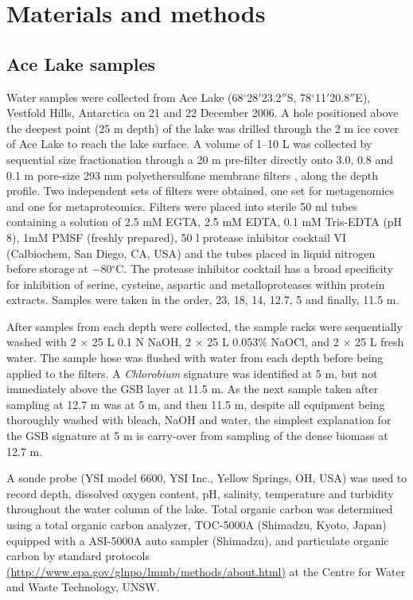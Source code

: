 
\section{Materials and methods}
\label{sec:ace_mm}
\subsection{Ace Lake samples}
Water samples were collected from Ace Lake (68$^{\circ}$28$'$23.2$''$S, 78$^{\circ}$11$'$20.8$''$E), Vestfold Hills, Antarctica on 21 and 22 December 2006. 
A hole positioned above the deepest point (25 m depth) of the lake was drilled through the 2 m ice cover of Ace Lake to reach the lake surface.
A volume of 1--10 L was collected by sequential size fractionation through a 20 \textmu{}m pre-filter directly onto 3.0, 0.8 and 0.1 \textmu{}m pore-size 293 mm polyethersulfone membrane filters \cite{Rusch2007}, along the depth profile.
Two independent sets of filters were obtained, one set for metagenomics and one for metaproteomics.
Filters were placed into sterile 50 ml tubes containing a solution of 2.5 mM EGTA, 2.5 mM EDTA, 0.1 mM Tris-EDTA (pH 8), 1mM PMSF (freshly prepared), 50 \textmu{}l protease inhibitor cocktail VI (Calbiochem, San Diego, \textsc{CA}, \textsc{USA}) and the tubes placed in liquid nitrogen before storage at $-$80$^{\circ}$C.
The protease inhibitor cocktail has a broad specificity for inhibition of serine, cysteine, aspartic and metalloproteases within protein extracts.
Samples were taken in the order, 23, 18, 14, 12.7, 5 and finally, 11.5 m.

After samples from each depth were collected, the sample racks were sequentially washed with 2 $\times$ 25 L 0.1 N NaOH, 2 $\times$ 25 L 0.053\% NaOCl, and 2 $\times$ 25 L fresh water. 
The sample hose was flushed with water from each depth before being applied to the filters. 
A \emph{Chlorobium} signature was identified at 5 m, but not immediately above the \ac{GSB} layer at 11.5 m. 
As the next sample taken after sampling at 12.7 m was at 5 m, and then 11.5 m, despite all equipment being thoroughly washed with bleach, NaOH and water, 
the simplest explanation for the \ac{GSB} signature at 5 m is carry-over from sampling of the dense biomass at 12.7 m. 

A sonde probe (\textsc{YSI} model 6600, \textsc{YSI} Inc., Yellow Springs, \textsc{OH}, \textsc{USA}) was used to record depth, dissolved oxygen content, pH, salinity, temperature and turbidity throughout the water column of the lake. 
Total organic carbon was determined using a total organic carbon analyzer, TOC-5000A (Shimadzu, Kyoto, Japan) equipped with a \textsc{ASI}-5000A auto sampler (Shimadzu), and particulate organic carbon by standard protocols 
\url{(http://www.epa.gov/glnpo/lmmb/methods/about.html)} 
at the Centre for Water and Waste Technology, \textsc{UNSW}.

